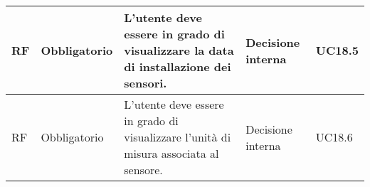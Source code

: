 \begin{longtable}{|C{1cm}|C{2cm}|>{\raggedright}m{5cm}|C{2cm}|C{1.5cm}|}
    \hline
     RF & Obbligatorio & L'utente deve essere in grado di visualizzare la data di installazione dei sensori. & Decisione interna & UC18.5 \\
    
    \hline
     RF & Obbligatorio & L'utente deve essere in grado di visualizzare l'unità di misura associata al sensore. & Decisione interna & UC18.6 \\
    
    \hline
    
\end{longtable}


